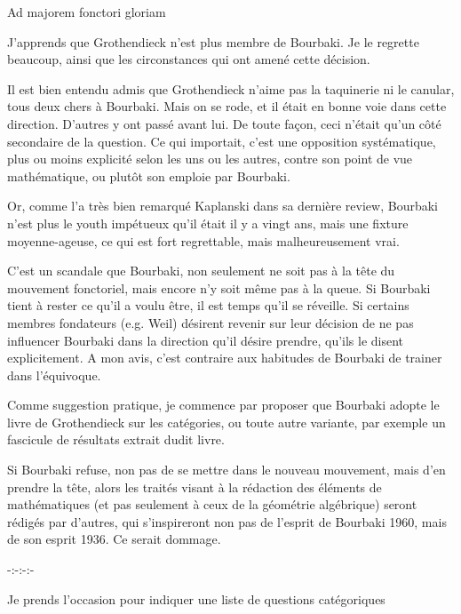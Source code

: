 \begin{center}Ad majorem fonctori gloriam\end{center}

J'apprends que Grothendieck n'est plus membre de Bourbaki. Je le regrette beaucoup, ainsi que les circonstances qui ont amené cette décision.

Il est bien entendu admis que Grothendieck n'aime pas la taquinerie ni le canular, tous deux chers à Bourbaki. Mais on se rode, et il était en bonne voie dans cette direction. D'autres y ont passé avant lui. De toute façon, ceci n'était qu'un côté secondaire de la question. Ce qui importait, c'est une opposition systématique, plus ou moins explicité selon les uns ou les autres, contre son point de vue mathématique, ou plutôt son emploie par Bourbaki.

Or, comme l'a très bien remarqué Kaplanski dans sa dernière review, Bourbaki n'est plus le youth impétueux qu'il était il y a vingt ans, mais une fixture moyenne-ageuse, ce qui est fort regrettable, mais malheureusement vrai.

C'est un scandale que Bourbaki, non seulement ne soit pas à la tête du mouvement fonctoriel, mais encore n'y soit même pas à la queue. Si Bourbaki tient à rester ce qu'il a voulu être, il est temps qu'il se réveille. Si certains membres fondateurs (e.g. Weil) désirent revenir sur leur décision de ne pas influencer Bourbaki dans la direction qu'il désire prendre, qu'ils le disent explicitement. A mon avis, c'est contraire aux habitudes de Bourbaki de trainer dans l'équivoque.

Comme suggestion pratique, je commence par proposer que Bourbaki adopte le livre de Grothendieck sur les catégories, ou toute autre variante, par exemple un fascicule de résultats extrait dudit livre.

Si Bourbaki refuse, non pas de se mettre dans le nouveau mouvement, mais d'en prendre la tête, alors les traités visant à la rédaction des éléments de mathématiques (et pas seulement à ceux de la géométrie algébrique) seront rédigés par d'autres, qui s'inspireront non pas de l'esprit de Bourbaki 1960, mais de son esprit 1936. Ce serait dommage.

\begin{center}-:-:-:-\end{center}

Je prends l'occasion pour indiquer une liste de questions catégoriques

